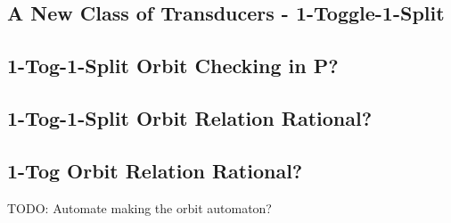 \documentclass{article}
\newcommand{\0}{\underline{0}}
\newcommand{\1}{\underline{1}}
\newcommand{\2}{\underline{2}}
\begin{document}
\subsection*{A New Class of Transducers - 1-Toggle-1-Split}

\subsection*{1-Tog-1-Split Orbit Checking in P?}

\subsection*{1-Tog-1-Split Orbit Relation Rational?}

\subsection*{1-Tog Orbit Relation Rational?}

TODO: Automate making the orbit automaton?
\end{document}

